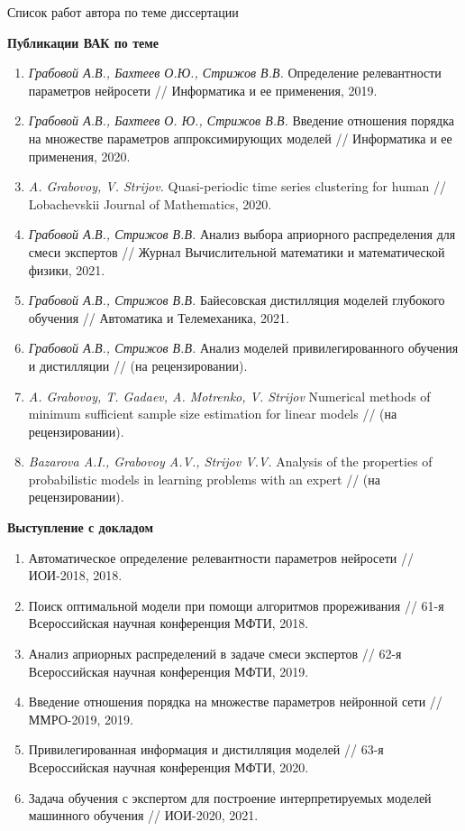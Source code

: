 \documentclass[10pt,pdf,hyperref={unicode}]{beamer}
\begin{document}
\begin{frame}{Список работ автора по теме диссертации}
\justifying
{
\scriptsize
\textbf{Публикации ВАК по теме}

\begin{enumerate}
\item \textit{Грабовой А.В., Бахтеев О.Ю., Стрижов В.В.} Определение релевантности параметров нейросети // Информатика и ее применения, 2019.
\item \textit{Грабовой А.В., Бахтеев О. Ю., Стрижов В.В.} Введение отношения порядка на множестве параметров аппроксимирующих моделей // Информатика и ее применения, 2020.
\item \textit{A. Grabovoy, V. Strijov.} Quasi-periodic time series clustering for human // Lobachevskii Journal of Mathematics, 2020.
\item \textit{Грабовой А.В., Стрижов В.В.} Анализ выбора априорного распределения для смеси экспертов // Журнал Вычислительной математики и математической физики, 2021.
\item \textit{Грабовой А.В., Стрижов В.В.} Байесовская дистилляция моделей глубокого обучения // Автоматика и Телемеханика, 2021.
\item \textit{Грабовой А.В., Стрижов В.В.} Анализ моделей привилегированного обучения и дистилляции // (на рецензировании).
\item \textit{A. Grabovoy, T. Gadaev, A. Motrenko, V. Strijov} Numerical methods of minimum sufficient sample size estimation for linear models // (на рецензировании).
\item \textit{Bazarova A.I., Grabovoy A.V., Strijov V.V.} Analysis of the properties of probabilistic models in learning problems with an expert // (на рецензировании).
\end{enumerate}

\textbf{Выступление с докладом}
\begin{enumerate}
\item Автоматическое определение релевантности параметров нейросети // ИОИ-2018, 2018.
\item Поиск оптимальной модели при помощи алгоритмов прореживания // 61-я Всероссийская научная конференция МФТИ, 2018.
\item Анализ априорных распределений в задаче смеси экспертов // 62-я Всероссийская научная конференция МФТИ, 2019.
\item Введение отношения порядка на множестве параметров нейронной сети // ММРО-2019, 2019.
\item Привилегированная информация и дистилляция моделей // 63-я Всероссийская научная конференция МФТИ, 2020.
\item Задача обучения с экспертом для построение интерпретируемых моделей машинного обучения // ИОИ-2020, 2021.
\end{enumerate}
}
\end{frame}
\end{document}
